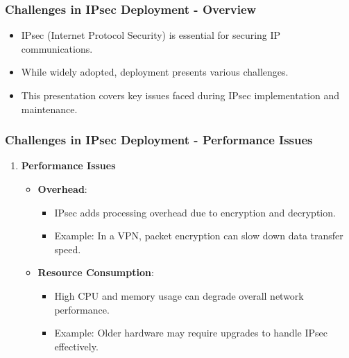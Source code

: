 \documentclass{beamer}
\begin{document}
\begin{frame}[fragile]
    \frametitle{Challenges in IPsec Deployment - Overview}
    \begin{itemize}
        \item IPsec (Internet Protocol Security) is essential for securing IP communications.
        \item While widely adopted, deployment presents various challenges.
        \item This presentation covers key issues faced during IPsec implementation and maintenance.
    \end{itemize}
\end{frame}

\begin{frame}[fragile]
    \frametitle{Challenges in IPsec Deployment - Performance Issues}
    \begin{enumerate}
        \item \textbf{Performance Issues}
        \begin{itemize}
            \item \textbf{Overhead}:
            \begin{itemize}
                \item IPsec adds processing overhead due to encryption and decryption.
                \item Example: In a VPN, packet encryption can slow down data transfer speed.
            \end{itemize}
            
            \item \textbf{Resource Consumption}:
            \begin{itemize}
                \item High CPU and memory usage can degrade overall network performance.
                \item Example: Older hardware may require upgrades to handle IPsec effectively.
            \end{itemize}
        \end{itemize}
    \end{enumerate}
\end{frame}
\end{document}
